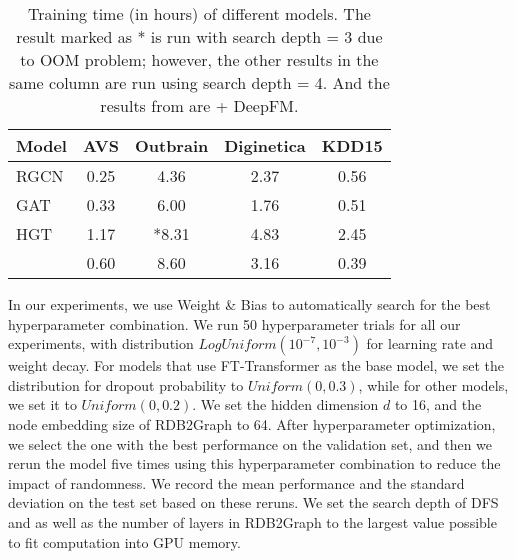 \begin{table}[ht]
    \caption{Training time (in hours) of different models. The result marked as * is run with search depth = 3 due to OOM problem; however, the other results in the same column are run using search depth = 4. And the results from \model{} are \model{} + DeepFM.}
    \centering
    \renewcommand\arraystretch{1.25}
    \begin{tabular}{l|c|c|c|c}
        \toprule %
        \multirow{1}{*}{Model} & \textbf{AVS} & \textbf{Outbrain} & \textbf{Diginetica} & \textbf{KDD15}\\
        \midrule
        RGCN & 0.25 & 4.36 & 2.37 & 0.56 \\
        GAT  & 0.33 & 6.00 & 1.76 & 0.51 \\
        HGT  & 1.17 & *8.31 & 4.83 & 2.45 \\
        \model{} & 0.60 & 8.60 & 3.16 & 0.39 \\
        \bottomrule
    \end{tabular}
    \label{tab:time_compare}
\end{table}

In our experiments, we use Weight \& Bias \cite{wandb} to automatically search for the best hyperparameter combination. %
We run 50 hyperparameter trials for all our experiments, with distribution $LogUniform(10^{-7}, 10^{-3})$ for learning rate and weight decay. For models that use FT-Transformer as the base model, we set the distribution for dropout probability to $Uniform(0, 0.3)$, while for other models, we set it to $Uniform(0, 0.2)$.  We set the hidden dimension $d$ to 16, and the node embedding size of RDB2Graph to 64.  After hyperparameter optimization, we select the one with the best performance on the validation set, and then we rerun the model five times using this hyperparameter combination to reduce the impact of randomness. We record the mean performance and the standard deviation on the test set based on these reruns. We set the search depth of DFS and \model{} as well as the number of layers in RDB2Graph to the largest value possible to fit computation into GPU memory.

